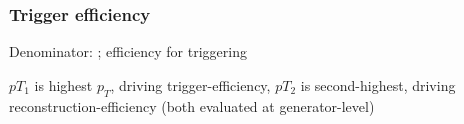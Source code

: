 \documentclass[compress]{beamer}
\begin{document}
\begin{frame}
\frametitle{Trigger efficiency}

Denominator: ; efficiency for triggering 

\vfill
$pT_1$ is highest $p_T$, driving trigger-efficiency, $pT_2$ is second-highest, driving reconstruction-efficiency (both evaluated at generator-level)

\vfill
{}


\end{frame}
\end{document}
